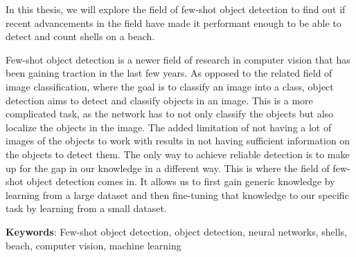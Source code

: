 In this thesis, we will explore the field of few-shot object detection to find out if recent advancements in the field have made it performant enough to be able to detect and count shells on a beach.

Few-shot object detection is a newer field of research in computer vision that has been gaining traction in the last few years. 
As opposed to the related field of image classification, where the goal is to classify an image into a class, object detection aims to detect and classify objects in an image. This is a more complicated task, as the network has to not only classify the objects but also localize the objects in the image. The added limitation of not having a lot of images of the objects to work with results in not having sufficient information on the objects to detect them. The only way to achieve reliable detection is to make up for the gap in our knowledge in a different way. This is where the field of few-shot object detection comes in. It allows us to first gain generic knowledge by learning from a large dataset and then fine-tuning that knowledge to our specific task by learning from a small dataset.

\textbf{Keywords}: Few-shot object detection, object detection, neural networks, shells, beach, computer vision, machine learning